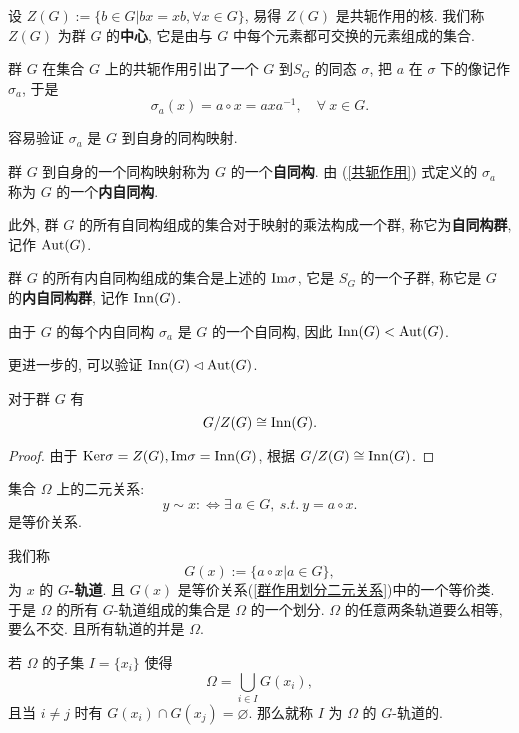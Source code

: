 \begin{definition}\label{中心}
	设 $Z(G):=\{b\in G|bx=xb,\forall x\in G\}$, 易得 $Z(G)$ 是共轭作用的核. 我们称 $Z(G)$ 为群 $G$ 的\textbf{中心}, 它是由与 $G$ 中每个元素都可交换的元素组成的集合.
\end{definition}

群 $G$ 在集合 $G$ 上的共轭作用引出了一个 $G$ 到$S_G$ 的同态 $\sigma$, 把 $a$ 在 $\sigma$ 下的像记作 $\sigma_a$, 于是
\begin{equation}
	\sigma_a(x)=a\circ x=axa^{-1},\quad \forall\ x\in G.\label{共轭作用}
\end{equation}

容易验证 $\sigma_a$ 是 $G$ 到自身的同构映射.

\begin{definition}\label{自同构}
	群 $G$ 到自身的一个同构映射称为 $G$ 的一个\textbf{自同构}. 由 (\ref{共轭作用}) 式定义的 $\sigma_a$ 称为 $G$ 的一个\textbf{内自同构}.

	此外, 群 $G$ 的所有自同构组成的集合对于映射的乘法构成一个群, 称它为\textbf{自同构群}, 记作 $\text {Aut}(G)$.

	群 $G$ 的所有内自同构组成的集合是上述的 $\text {Im}\sigma$, 它是 $S_G$ 的一个子群, 称它是 $G$ 的\textbf{内自同构群}, 记作 $\text {Inn}(G)$.
\end{definition}

由于 $G$ 的每个内自同构 $\sigma_a$ 是 $G$ 的一个自同构, 因此 $\text {Inn}(G)<\text {Aut}(G)$.

更进一步的, 可以验证 $\text {Inn}(G)\lhd\text {Aut}(G)$.

\begin{theorem}
	对于群 $G$ 有 $$G/Z(G)\cong \text {Inn}(G).$$
\end{theorem}

\begin{proof}
	由于 $\text {Ker}\sigma=Z(G),\text {Im}\sigma=\text {Inn}(G)$, 根据 $G/Z(G)\cong \text {Inn}(G)$.
\end{proof}

\begin{lemma}
	集合 $\Omega$ 上的二元关系:
	\begin{equation}
		y\sim x:\Leftrightarrow\exists\ a\in G,\ s.t.\ y=a\circ x.\label{群作用划分二元关系}
	\end{equation}
	是等价关系.
\end{lemma}

\begin{definition}\label{轨道}
	我们称 $$G(x):=\{a\circ x|a\in G\},$$ 为 $x$ 的 \textbf{$G$-轨道}. 且 $G(x)$ 是等价关系(\ref{群作用划分二元关系})中的一个等价类. 于是 $\Omega$ 的所有 $G$-轨道组成的集合是 $\Omega$ 的一个划分. $\Omega$ 的任意两条轨道要么相等, 要么不交. 且所有轨道的并是 $\Omega$.

	若 $\Omega$ 的子集 $I=\{x_i\}$ 使得
	\begin{equation}
		\Omega=\bigcup\limits_{i\in I}G(x_i),\label{轨道划分}
	\end{equation}
	且当 $i\neq j$ 时有 $G(x_i)\cap G(x_j)=\varnothing$. 那么就称 $I$ 为 $\Omega$ 的 $G$-轨道的.
\end{definition}

